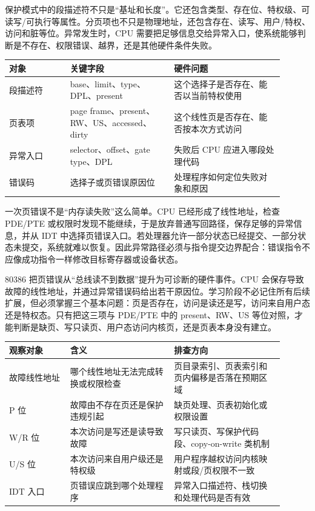 保护模式中的段描述符不只是“基址和长度”。它还包含类型、存在位、特权级、可读写/可执行等属性。分页项也不只是物理地址，还包含存在、读写、用户/特权、访问和脏等位。异常发生时，CPU 需要把足够信息交给异常入口，使系统能够判断是不存在、权限错误、越界，还是其他硬件条件失败。

\begin{longtable}{L{0.2\linewidth}L{0.34\linewidth}L{0.36\linewidth}}
\toprule
对象 & 关键字段 & 硬件问题 \\
\midrule
段描述符 & base、limit、type、DPL、present & 这个选择子是否存在、能否以当前特权使用 \\
页表项 & page frame、present、RW、US、accessed、dirty & 这个线性页是否存在、能否按本次方式访问 \\
异常入口 & selector、offset、gate type、DPL & 失败后 CPU 应进入哪段处理代码 \\
错误码 & 选择子或页错误原因位 & 处理程序如何定位失败对象和原因 \\
\bottomrule
\end{longtable}

一次页错误不是“内存读失败”这么简单。CPU 已经形成了线性地址，检查 PDE/PTE 或权限时发现不能继续，于是放弃普通写回路径，保存足够的异常信息，并从 IDT 中选择页错误入口。若处理器允许一部分状态已经提交、一部分状态未提交，系统就难以恢复。因此异常路径必须与指令提交边界配合：错误指令不应像成功指令一样修改目标寄存器或设备状态。

80386 把页错误从“总线读不到数据”提升为可诊断的硬件事件。CPU 会保存导致故障的线性地址，并通过异常错误码给出若干原因位。学习阶段不必记住所有后续扩展，但必须掌握三个基本问题：页是否存在，访问是读还是写，访问来自用户态还是特权态。只有把这三项与 PDE/PTE 中的 present、RW、US 等位对照，才能判断是缺页、写只读页、用户态访问内核页，还是页表本身没有建立。

\begin{longtable}{L{0.2\linewidth}L{0.34\linewidth}L{0.36\linewidth}}
\toprule
观察对象 & 含义 & 排查方向 \\
\midrule
故障线性地址 & 哪个线性地址无法完成转换或权限检查 & 页目录索引、页表索引和页内偏移是否落在预期区域 \\
P 位 & 故障由不存在页还是保护违规引起 & 缺页处理、页表初始化或权限设置 \\
W/R 位 & 本次访问是写还是读导致故障 & 写只读页、写保护代码段、copy-on-write 类机制 \\
U/S 位 & 本次访问来自用户级还是特权级 & 用户程序越权访问内核映射或段/页权限不一致 \\
IDT 入口 & 页错误应跳到哪个处理程序 & 异常入口描述符、栈切换和处理代码是否有效 \\
\bottomrule
\end{longtable}


